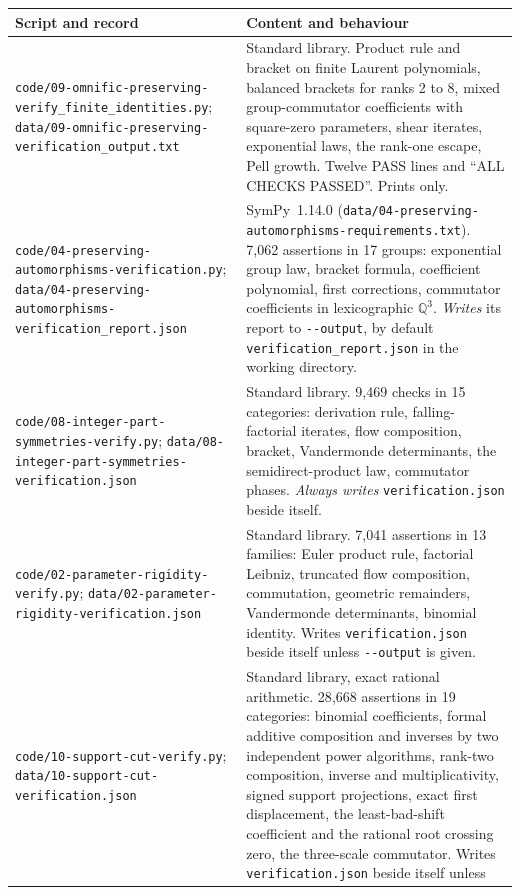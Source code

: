 \documentclass[11pt,oneside]{article}
\numberwithin{equation}{section}
\theoremstyle{definition}
\theoremstyle{remark}
\newcommand{\Q}{\mathbb Q}
\newcommand{\fn}[1]{\nolinkurl{#1}}
\begin{document}
\begin{center}
\renewcommand{\arraystretch}{1.15}
\begin{longtable}{>{\raggedright\arraybackslash}p{}>{\raggedright\arraybackslash}p{}}
\toprule
Script and record & Content and behaviour\\
\midrule
\endhead
\fn{code/09-omnific-preserving-verify_finite_identities.py};
\fn{data/09-omnific-preserving-verification_output.txt} & Standard library. Product rule
and bracket on finite Laurent polynomials, balanced brackets for ranks 2 to 8, mixed
group-commutator coefficients with square-zero parameters, shear iterates, exponential
laws, the rank-one escape, Pell growth. Twelve PASS lines and ``ALL CHECKS PASSED''.
Prints only.\\
\fn{code/04-preserving-automorphisms-verification.py};
\fn{data/04-preserving-automorphisms-verification_report.json} & SymPy~1.14.0
(\fn{data/04-preserving-automorphisms-requirements.txt}). 7{,}062 assertions in 17 groups:
exponential group law, bracket formula, coefficient polynomial, first corrections,
commutator coefficients in lexicographic $\Q^3$. \emph{Writes} its report to
\fn{--output}, by default \fn{verification_report.json} in the working directory.\\
\fn{code/08-integer-part-symmetries-verify.py};
\fn{data/08-integer-part-symmetries-verification.json} & Standard library. 9{,}469 checks in
15 categories: derivation rule, falling-factorial iterates, flow composition, bracket,
Vandermonde determinants, the semidirect-product law, commutator phases. \emph{Always
writes} \fn{verification.json} beside itself.\\
\fn{code/02-parameter-rigidity-verify.py};
\fn{data/02-parameter-rigidity-verification.json} & Standard library. 7{,}041 assertions in 13
families: Euler product rule, factorial Leibniz, truncated flow composition, commutation,
geometric remainders, Vandermonde determinants, binomial identity. Writes
\fn{verification.json} beside itself unless \fn{--output} is given.\\
\fn{code/10-support-cut-verify.py};
\fn{data/10-support-cut-verification.json} & Standard library, exact rational
arithmetic. 28{,}668 assertions in 19 categories: binomial coefficients, formal
additive composition and inverses by two independent power algorithms, rank-two
composition, inverse and multiplicativity, signed support projections, exact first
displacement, the least-bad-shift coefficient and the rational root crossing zero,
the three-scale commutator. Writes \fn{verification.json} beside itself unless

\end{longtable}
\end{center}
\end{document}

